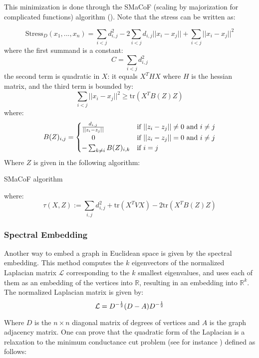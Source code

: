 This minimization is done through the SMaCoF (scaling by majorization for complicated functions) algorithm (\cite{de2011applications}). Note that the stress can be written as:

\[
  \text{Stress}_D(x_1, ... , x_n) = \sum_{i < j} d_{i,j}^2 - 2\sum_{i<j} d_{i,j}||x_i - x_j|| + \sum_{i<j} ||x_i - x_j||^2
\]
where the first summand is a constant:
\[
    C = \sum_{i < j} d_{i,j}^2
\]
the second term is quadratic in $X$: it equals $X^THX$ where $H$ is the hessian matrix, and the third term is bounded by:
\[
    \sum_{i<j} ||x_i - x_j||^2 \geq \text{tr}(X^TB(Z)Z)
\]
where:
\[
    B(Z)_{i,j} = \begin{cases} {d_{i,j}\over||z_i - z_j||} &\text{if }||z_i - z_j||\neq 0 \text{ and }i\neq j\\
    \hspace{5mm}0 &\text{if } ||z_i - z_j|| = 0\text{ and }i \neq j\\
    -\sum_{k \neq i}B(Z)_{i,k} &\text{if } i=j\end{cases}
\]
Where $Z$ is given in the following algorithm:

\begin{algorithm}[H]
\SetAlgoLined
{}
\caption{SMaCoF algorithm}
\end{algorithm}

where:
\[
  \tau(X,Z) := \sum_{i,j}d_{i,j}^2 + \text{tr}(X^T V X) - 2 \text{tr}(X^TB(Z)Z)
\]

\subsubsection{Spectral Embedding}
Another way to embed a graph in Euclidean space is given by the spectral embedding. This method computes the $k$ eigenvectors of the normalized Laplacian matrix $\mathcal{L}$  corresponding to the $k$ smallest eigenvalues, and uses each of them as an embedding of the  vertices into $\mathbb{R}$, resulting in an  embedding into $\mathbb{R}^k$. The normalized Laplacian matrix is given by:
\[
    \mathcal{L} = D^{-{1\over 2}}(D - A)D^{-{1\over 2}}
\]

Where $D$ is the $n \times n$ diagonal matrix of degrees of vertices and $A$ is the graph adjacency matrix. One can prove that the quadratic form of the Laplacian is a relaxation to the minimum conductance cut problem (see for instance \cite{chung1997spectral}) defined as follows:

